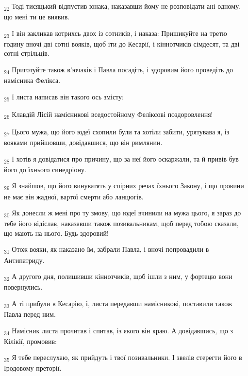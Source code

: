 \begin{tcolorbox}
\textsubscript{22} Тоді тисяцький відпустив юнака, наказавши йому не розповідати ані одному, що мені ти це виявив.
\end{tcolorbox}
\begin{tcolorbox}
\textsubscript{23} І він закликав котрихсь двох із сотників, і наказа: Пришикуйте на третю годину вночі дві сотні вояків, щоб іти до Кесарії, і кіннотчиків сімдесят, та дві сотні стрільців.
\end{tcolorbox}
\begin{tcolorbox}
\textsubscript{24} Приготуйте також в'ючаків і Павла посадіть, і здоровим його проведіть до намісника Фелікса.
\end{tcolorbox}
\begin{tcolorbox}
\textsubscript{25} І листа написав він такого ось змісту:
\end{tcolorbox}
\begin{tcolorbox}
\textsubscript{26} Клавдій Лісій намісникові вседостойному Феліксові поздоровлення!
\end{tcolorbox}
\begin{tcolorbox}
\textsubscript{27} Цього мужа, що його юдеї схопили були та хотіли забити, урятувава я, із вояками прийшовши, довідавшися, що він римлянин.
\end{tcolorbox}
\begin{tcolorbox}
\textsubscript{28} І хотів я довідатися про причину, що за неї його оскаржали, та й привів був його до їхнього синедріону.
\end{tcolorbox}
\begin{tcolorbox}
\textsubscript{29} Я знайшов, що його винуватять у спірних речах їхнього Закону, і що провини не має він жадної, вартої смерти або ланцюгів.
\end{tcolorbox}
\begin{tcolorbox}
\textsubscript{30} Як донесли ж мені про ту змову, що юдеї вчинили на мужа цього, я зараз до тебе його відіслав, наказавши також позивальникам, щоб перед тобою сказали, що мають на нього. Будь здоровий!
\end{tcolorbox}
\begin{tcolorbox}
\textsubscript{31} Отож вояки, як наказано їм, забрали Павла, і вночі попровадили в Антипатриду.
\end{tcolorbox}
\begin{tcolorbox}
\textsubscript{32} А другого дня, полишивши кіннотчиків, щоб ішли з ним, у фортецю вони повернулись.
\end{tcolorbox}
\begin{tcolorbox}
\textsubscript{33} А ті прибули в Кесарію, і, листа передавши намісникові, поставили також Павла перед ним.
\end{tcolorbox}
\begin{tcolorbox}
\textsubscript{34} Намісник листа прочитав і спитав, із якого він краю. А довідавшись, що з Кілікії, промовив:
\end{tcolorbox}
\begin{tcolorbox}
\textsubscript{35} Я тебе переслухаю, як прийдуть і твої позивальники. І звелів стерегти його в Іродовому преторії.
\end{tcolorbox}
